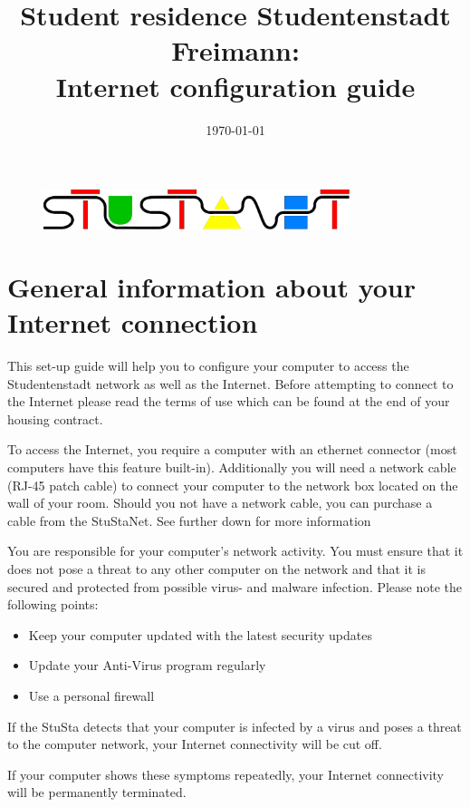 \documentclass[a4paper,12pt]{scrartcl}
\title{Student residence Studentenstadt Freimann:\\
       Internet configuration guide}
\date{\today}
\begin{document}
\maketitle

\begin{figure}[t!]
   \centering
   \vspace{-20pt}
   \includegraphics[width=0.8\textwidth,keepaspectratio]{Bilder/stunetp}
   \vspace{-20pt}
\end{figure}

\section*{General information about your Internet connection}

This set-up guide will help you to configure your computer to access the Studentenstadt network as well as the Internet. Before attempting to connect to the Internet please read the terms of use which can be found at the end of your housing contract.

To access the Internet, you require a computer with an ethernet connector (most computers have this feature built-in). Additionally you will need a network cable (RJ-45 patch cable) to connect your computer to the network box located on the wall of your room. Should you not have a network cable, you can purchase a cable from the StuStaNet. See further down for more information

You are responsible for your computer's network activity. You must ensure that it does not pose a threat to any other computer on the network and that it is secured and protected from possible virus- and malware infection. Please note the following points:
\begin{itemize}
    \item Keep your computer updated with the latest security updates
    \item Update your Anti-Virus program regularly
    \item Use a personal firewall
\end{itemize}
If the StuSta detects that your computer is infected by a virus and poses a threat to the computer network, your Internet connectivity will be cut off.

\begin{em}
If your computer shows these symptoms repeatedly, your Internet connectivity will be permanently terminated.
\end{em}
\end{document}
